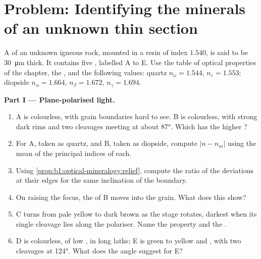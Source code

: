 \section{Problem: Identifying the minerals of an unknown thin section}

\begin{problem}
\label{pb:b1:optical-mineralogy:1}
A  of an unknown igneous rock, mounted in a resin of index
$1.540$, is said to be \qty{30}{\micro m} thick. It contains five ,
labelled A to E. Use the table of optical properties of the chapter, the
, and the following values: quartz $n_\omega = 1.544$,
$n_\varepsilon = 1.553$; diopside $n_\alpha = 1.664$, $n_\beta = 1.672$,
$n_\gamma = 1.694$.

\medskip
\noindent\textbf{Part I --- Plane-polarised light.}
\begin{enumerate}
  \item {} A is colourless, with grain boundaries hard to see.  B
        is colourless, with strong dark rims and two cleavages meeting at
        about \ang{87}. Which has the higher ?
  \item For A, taken as quartz, and B, taken as diopside, compute
        $|n - n_m|$ using the mean of the principal indices of each.
  \item Using \cref{prop:b1:optical-mineralogy:relief}, compute the ratio of
        the deviations at their edges for the same inclination of the boundary.
  \item On raising the focus, the  of B moves into the grain. What
        does this show?
  \item {} C turns from pale yellow to dark brown as the stage rotates,
        darkest when its single cleavage lies along the polariser. Name the
        property and the .
  \item {} D is colourless, of low , in long laths; E is green to
        yellow and , with two cleavages at \ang{124}. What does the
        angle suggest for E?
\end{enumerate}


\end{problem}
